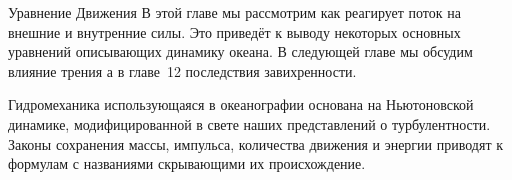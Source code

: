 
\begin{chapter}{Уравнение Движения}\label{chap:7}
В этой главе мы рассмотрим как реагирует поток на внешние и внутренние
силы.  Это приведёт к выводу некоторых основных уравнений описывающих
динамику океана. В следующей главе мы обсудим влияние трения а в
главе~12 последствия завихренности.
%

Гидромеханика использующаяся в океанографии основана на Ньютоновской
динамике, модифицированной в свете наших представлений о
турбулентности. Законы сохранения массы, импульса, количества движения
и энергии приводят к формулам с названиями скрывающими их
происхождение.  
%


\end{chapter}
